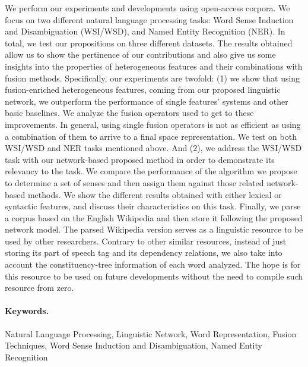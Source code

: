 We perform our experiments and developments using open-access corpora. We focus on two different natural language processing tasks: Word Sense Induction and Disambiguation (WSI/WSD), and Named Entity Recognition (NER). In total, we test our propositions on three different datasets. The results obtained allow us to show the pertinence of our contributions and also give us some insights into the properties of heterogeneous features and their combinations with fusion methods. Specifically, our experiments are twofold: (1) we show that using fusion-enriched heterogeneous features, coming from our proposed linguistic network, we outperform the performance of single features' systems and other basic baselines. We analyze the fusion operators used to get to these improvements. In general, using single fusion operators is not as efficient as using a combination of them to arrive to a final space representation. We test on both WSI/WSD and NER tasks mentioned above. And (2), we address the WSI/WSD task with our network-based proposed method in order to demonstrate its relevancy to the task. We compare the performance of the algorithm we propose to determine a set of senses and then assign them against those related network-based methods. We show the different results obtained with either lexical or syntactic features, and discuss their characteristics on this task. Finally, we parse a corpus based on the English Wikipedia and then store it following the proposed network model. The parsed Wikipedia version serves as a linguistic resource to be used by other researchers. Contrary to other similar resources, instead of just storing its part of speech tag and its dependency relations,  we also take into account the constituency-tree information of each word analyzed. The hope is for this resource to be used on future developments without the need to compile such resource from zero.

\paragraph{Keywords.} Natural Language Processing, Linguistic Network, Word Representation, Fusion Techniques, Word Sense Induction and Disambiguation, Named Entity Recognition
